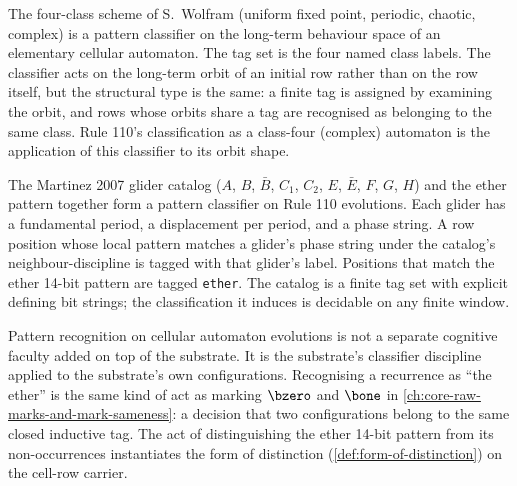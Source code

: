\begin{example}
\label{ex:cellular-automaton-wolfram-class}
The four-class scheme of S.\ Wolfram (uniform fixed point, periodic, chaotic, complex) is a pattern classifier on the long-term behaviour space of an elementary cellular automaton. The tag set is the four named class labels. The classifier acts on the long-term orbit of an initial row rather than on the row itself, but the structural type is the same: a finite tag is assigned by examining the orbit, and rows whose orbits share a tag are recognised as belonging to the same class. Rule 110's classification as a class-four (complex) automaton is the application of this classifier to its orbit shape.
\end{example}

\begin{example}
\label{ex:cellular-automaton-glider-catalog}
The Martinez 2007 glider catalog (\(A\), \(B\), \(\bar{B}\), \(C_1\), \(C_2\), \(E\), \(\bar{E}\), \(F\), \(G\), \(H\)) and the ether pattern together form a pattern classifier on Rule 110 evolutions. Each glider has a fundamental period, a displacement per period, and a phase string. A row position whose local pattern matches a glider's phase string under the catalog's neighbour-discipline is tagged with that glider's label. Positions that match the ether 14-bit pattern are tagged \texttt{ether}. The catalog is a finite tag set with explicit defining bit strings; the classification it induces is decidable on any finite window.
\end{example}

\begin{principle}
\label{prin:cellular-automaton-pattern-recognition-is-mark}
Pattern recognition on cellular automaton evolutions is not a separate cognitive faculty added on top of the substrate. It is the substrate's classifier discipline applied to the substrate's own configurations. Recognising a recurrence as ``the ether'' is the same kind of act as marking $\bzero$ and $\bone$ in \autoref{ch:core-raw-marks-and-mark-sameness}: a decision that two configurations belong to the same closed inductive tag. The act of distinguishing the ether 14-bit pattern from its non-occurrences instantiates the form of distinction (\autoref{def:form-of-distinction}) on the cell-row carrier.
\end{principle}

